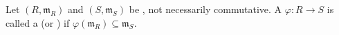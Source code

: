 \begin{definition} \label{definition:local_morphism_of_local_rings}
Let $(R,\mathfrak{m}_R)$ and $(S,\mathfrak{m}_S)$ be , not necessarily commutative.  
A  $\varphi : R \to S$ is called a  (or ) if $\varphi(\mathfrak{m}_R) \subseteq \mathfrak{m}_S$.
\end{definition}
